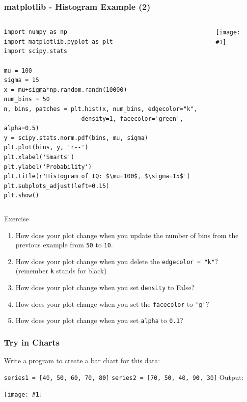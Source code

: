 \documentclass[xcolor=svgnames, handout]{beamer}
\newcommand{\ipic}[2]{\texttt{[image: \#1]}}
\newcommand{\ft}[1]{\frametitle{#1}}
\begin{document}
\begin{frame}[fragile]\ft{matplotlib - Histogram Example (2)}
\begin{columns}[T] %
\begin{column}{.5\textwidth}
\begin{Verbatim}[fontsize=\small,xleftmargin=.1in] 
import numpy as np
import matplotlib.pyplot as plt
import scipy.stats

mu = 100
sigma = 15
x = mu+sigma*np.random.randn(10000)
num_bins = 50
n, bins, patches = plt.hist(x, num_bins, edgecolor="k",
                      density=1, facecolor='green', alpha=0.5)
y = scipy.stats.norm.pdf(bins, mu, sigma)
plt.plot(bins, y, 'r--')
plt.xlabel('Smarts')
plt.ylabel('Probability')
plt.title(r'Histogram of IQ: $\mu=100$, $\sigma=15$')
plt.subplots_adjust(left=0.15)
plt.show()
\end{Verbatim}
\end{column}%
\hfill%
\begin{column}{.46\textwidth}
\hspace*{.2in}\ipic{hist2}{0.9}
\end{column}%
\end{columns}
\end{frame}

\begin{frame}[fragile]
\begin{exampleblock}{Exercise}
\begin{enumerate}
\item How does your plot change when you update the number of bins from the previous example from {\tt 50} to {\tt 10}.
\item How does your plot change when you delete the {\tt edgecolor = "k"}? (remember {\tt k} stands for black)
\item How does your plot change when you set {\tt density} to False?
\item How does your plot change when you set the {\tt facecolor} to \verb|'g'|?
\item How does your plot change when you set {\tt alpha} to {\tt 0.1}?
\end{enumerate}


\end{exampleblock}

\end{frame}



\begin{frame}\ft{Try in Charts}
\begin{example}
 Write a program to create a bar chart for this data:

{\tt series1 = [40, 50, 60, 70, 80]}\newline
{\tt series2 = [70, 50, 40, 90, 30]}\newline
Output:
\end{example}
\begin{center}
\ipic{barchart}{0.6}\end{center}



\end{frame}
\end{document}
